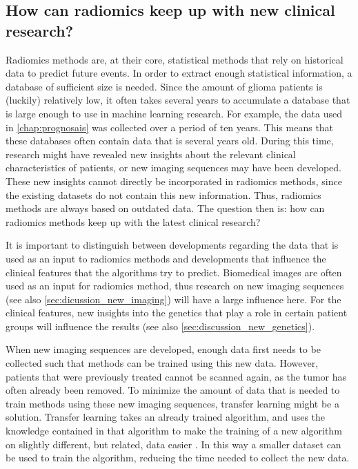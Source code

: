 \subsection{How can radiomics keep up with new clinical research?}
Radiomics methods are, at their core, statistical methods that rely on historical data to predict future events.
In order to extract enough statistical information, a database of sufficient size is needed.
Since the amount of glioma patients is (luckily) relatively low, it often takes several years to accumulate a database that is large enough to use in machine learning research.
For example, the data used in \cref{chap:prognosais} was collected over a period of ten years.
This means that these databases often contain data that is several years old.
During this time, research might have revealed new insights about the relevant clinical characteristics of patients, or new imaging sequences may have been developed.
These new insights cannot directly be incorporated in radiomics methods, since the existing datasets do not contain this new information.
Thus, radiomics methods are always based on outdated data.
The question then is: how can radiomics methods keep up with the latest clinical research?

It is important to distinguish between developments regarding the data that is used as an input to radiomics methods and developments that influence the clinical features that the algorithms try to predict.
Biomedical images are often used as an input for radiomics method, thus research on new imaging sequences (see also \cref{sec:dicussion_new_imaging}) will have a large influence here.
For the clinical features, new insights into the genetics that play a role in certain patient groups will influence the results (see also \cref{sec:discussion_new_genetics}).

When new imaging sequences are developed, enough data first needs to be collected such that methods can be trained using this new data.
However, patients that were previously treated cannot be scanned again, as the \gls{tumor} has often already been removed.
To minimize the amount of data that is needed to train methods using these new imaging sequences, transfer learning might be a solution.
Transfer learning takes an already trained algorithm, and uses the knowledge contained in that algorithm to make the training of a new algorithm on slightly different, but related, data easier \autocite{shin2016transfer}.
In this way a smaller dataset can be used to train the algorithm, reducing the time needed to collect the new data.

